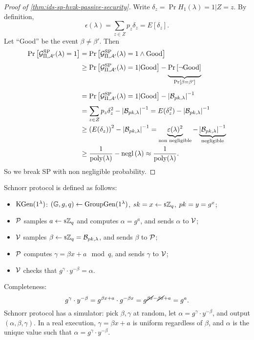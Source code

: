 \begin{proof}[Proof of \cref{thm:ids-sp-hvzk-passive-security}]
	Write $\delta_z = \Pr{H_1(\lambda) = 1 | Z = z}$.
	By definition,
	\begin{equation*}
		\epsilon(\lambda) = \sum_{z \in Z} p_z \delta_z = E[\delta_z].
	\end{equation*}
	Let ``Good'' be the event $\beta \neq \beta'$.
	Then
	\begin{align*}
		\Pr{\Game^{\mathrm{SP}}_{\Pi, \Adv'}(\lambda) = 1}
		& =
		\Pr{\Game^{\mathrm{SP}}_{\Pi, \Adv'}(\lambda) = 1 \land \text{Good}}
		\\
		& \ge
		\Pr{\Game^{\mathrm{SP}}_{\Pi, \Adv'}(\lambda) = 1 | \text{Good}} - \underbrace{\Pr{\neg \text{Good}}}_{\Pr{\beta = \beta'}}
		\\
		& =
		\Pr{\Game^{\mathrm{SP}}_{\Pi, \Adv'}(\lambda) = 1 | \text{Good}} - \abs{\B_{\pk, \lambda}}^{-1}
		\\
		& =
		\sum_{z \in Z} p_z \delta_z^2 - \abs{\B_{\pk, \lambda}}^{-1}
		=
		E(\delta_z^2) - \abs{\B_{\pk, \lambda}}^{-1}
		\\
		& \ge
		\left( E(\delta_z) \right)^2 - \abs{\B_{\pk, \lambda}}^{-1}
		=
		\underbrace{\epsilon(\lambda)^2}_{\text{non negligible}} - \underbrace{\abs{\B_{\pk, \lambda}}^{-1}}_{\text{negligible}}
		\\
		& \ge
		\frac{1}{\poly(\lambda)} - \negl{\lambda} \approx \frac{1}{\poly(\lambda)}.
	\end{align*}
	So we break \ac{SP} with non negligible probability.
\end{proof}

\begin{construction}
	Schnorr protocol is defined as follows:
	\begin{itemize}
		\item $\KGen(1^{\lambda})$: $\GroupGen$, $\sk = x \rand{\Integers_q}$, $\pk = y = g^x$;
		\item $\P$ samples $a \rand{\Integers_q}$ and computes $\alpha = g^a$, and sends $\alpha$ to $\V$;
		\item $\V$ samples $\beta \rand{\Integers_q} = \B_{\pk, \lambda}$, and sends $\beta$ to $\P$;
		\item $\P$ computes $\gamma = \beta x + a \mod q$, and sends $\gamma$ to $\V$;
		\item $\V$ checks that $g^{\gamma} \cdot y^{- \beta} = \alpha$.
	\end{itemize}
	Completeness:
	\begin{equation*}
		g^{\gamma} \cdot y^{-\beta}
		=
		g^{\beta x + a} \cdot g^{-\beta x}
		=
		g^{\cancel{\beta x} - \cancel{\beta x} + a}
		=
		g^a.
	\end{equation*}
	Schnorr protocol has a simulator:
	pick $\beta, \gamma$ at random, let $\alpha = g^{\gamma} \cdot y^{-\beta}$, and output $(\alpha, \beta, \gamma)$.
	In a real execution, $\gamma = \beta x + a$ is uniform regardless of $\beta$, and $\alpha$ is the unique value such that $\alpha = g^{\gamma} \cdot y^{-\beta}$.
\end{construction}

